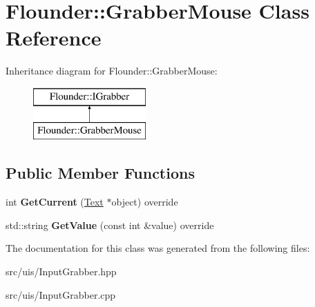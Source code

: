 \hypertarget{class_flounder_1_1_grabber_mouse}{}\section{Flounder\+:\+:Grabber\+Mouse Class Reference}
\label{class_flounder_1_1_grabber_mouse}
Inheritance diagram for Flounder\+:\+:Grabber\+Mouse\+:\begin{figure}[H]
\begin{center}
\leavevmode
\includegraphics[height=2.000000cm]{class_flounder_1_1_grabber_mouse}
\end{center}
\end{figure}
\subsection*{Public Member Functions}
\begin{DoxyCompactItemize}
\item 
\mbox{\label{class_flounder_1_1_grabber_mouse_a2c7776c052bd8a8015b4f0bbd927c282}} 
int {\bfseries Get\+Current} (\hyperlink{class_flounder_1_1_text}{Text} $\ast$object) override
\item 
\mbox{\label{class_flounder_1_1_grabber_mouse_af3c884373005980a9c55dce0a75f9ac9}} 
std\+::string {\bfseries Get\+Value} (const int \&value) override
\end{DoxyCompactItemize}


The documentation for this class was generated from the following files\+:\begin{DoxyCompactItemize}
\item 
src/uis/Input\+Grabber.\+hpp\item 
src/uis/Input\+Grabber.\+cpp\end{DoxyCompactItemize}
